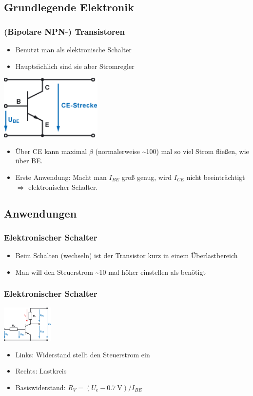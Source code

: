 \documentclass[ngerman,compress]{beamer}
\begin{document}
\subsection{Grundlegende Elektronik}

\begin{frame}
	\frametitle{(Bipolare NPN-) Transistoren}
	\begin{itemize}
		\item Benutzt man als elektronische Schalter
		\item Hauptsächlich sind sie aber Stromregler
	\end{itemize}
	\includegraphics[width=2in]{transistor.png}
	\begin{itemize}
		\item Über CE kann maximal $\beta$ (normalerweise \sim 100) mal so viel
			Strom fließen, wie über BE.
		\item Erste Anwendung: Macht man $I_{BE}$ groß genug, wird $I_{CE}$
			nicht beeinträchtigt $\Rightarrow$ elektronischer Schalter.
	\end{itemize}
\end{frame}

\subsection{Anwendungen}

\begin{frame}
	\frametitle{Elektronischer Schalter}
	\begin{itemize}
		\item Beim Schalten (wechseln) ist der Transistor kurz in einem
			Überlastbereich
		\item Man will den Steuerstrom \sim 10 mal höher einstellen als benötigt
	\end{itemize}
\end{frame}

\begin{frame}
	\frametitle{Elektronischer Schalter}
	\includegraphics[width=1in]{schalter.png}
	\begin{itemize}
		\item Links: Widerstand stellt den Steuerstrom ein
		\item Rechts: Lastkreis
		\item Basiswiderstand: $R_V = (U_e - \SI{0,7}{\volt}) / I_{BE}$
	\end{itemize}
\end{frame}
\end{document}
